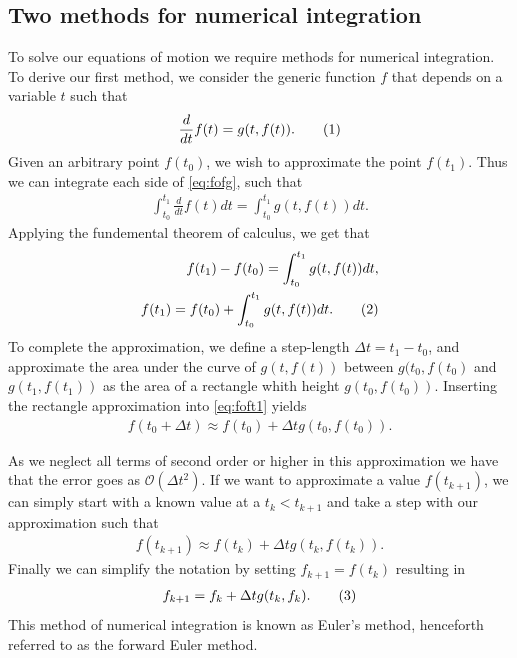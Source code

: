 \documentclass[reprint,english,notitlepage]{revtex4-1}  %
\newcommand\numberthis{\addtocounter{equation}{1}\tag{\theequation}}
\begin{document}
\subsection{Two methods for numerical integration} \label{sec:II:a}
To solve our equations of motion we require methods for numerical integration. To derive our first method, we consider the generic function \(f\) that depends on a variable \(t\) such that
\begin{align*}
	\frac{d}{dt}f(t) = g(t, f(t)). \numberthis \label{eq:fofg}
\end{align*}
Given an arbitrary point \(f(t_{0})\), we wish to approximate the point \(f(t_{1})\). Thus we can integrate each side of \eqref{eq:fofg}, such that
\begin{align*}
	\int_{t_{0}}^{t_{1}} \frac{d}{dt} f(t) dt = \int_{t_{0}}^{t_{1}} g(t, f(t)) dt.
\end{align*}
Applying the fundemental theorem of calculus, we get that
\begin{align*}
	f(t_{1}) - f(t_{0}) = \int_{t_{0}}^{t_{1}} g(t, f(t)) dt, \\
	f(t_{1}) = f(t_{0}) + \int_{t_{0}}^{t_{1}} g(t, f(t)) dt. \numberthis \label{eq:foft1}
\end{align*}
To complete the approximation, we define a step-length \(\Delta t = t_{1}-t_{0}\), and approximate the area under the curve of \(g(t, f(t))\) between \(g(t_{0}, f(t_{0})\) and \(g(t_{1}, f(t_{1}))\) as the area of a rectangle whith height \(g(t_{0}, f(t_{0}))\). Inserting the rectangle approximation into \eqref{eq:foft1} yields
\begin{align*}
	f(t_{0} + \Delta t) \approx f(t_{0}) + \Delta t g(t_{0}, f(t_{0})).
\end{align*}

As we neglect all terms of second order or higher in this approximation we have that the error goes as $\mathcal{O}(\Delta t^2)$.
If we want to approximate a value \(f(t_{k+1})\), we can simply start with a known value at a \(t_{k} < t_{k+1}\) and take a step with our approximation such that
\begin{align*}
	f(t_{k+1}) \approx f(t_{k}) + \Delta t g(t_{k}, f(t_{k})).
\end{align*}
Finally we can simplify the notation by setting \(f_{k+1} = f(t_{k})\) resulting in
\begin{align*}
	f_{k+1} = f_{k} + \Delta t g(t_{k}, f_{k}). \numberthis \label{eq:forwardEuler}
\end{align*}
This method of numerical integration is known as Euler's method, henceforth referred to as the forward Euler method.
\end{document}
